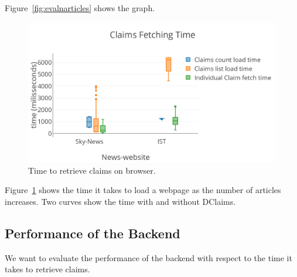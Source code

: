  Figure~\ref{fig:evalnarticles} shows the graph.


\begin{figure}[t]
  \centering
  \includegraphics[width=\columnwidth]{figures/chart-fetch.png}
  \vspace{-10pt}
  \caption{Time to retrieve claims on browser.}
  \label{fig:evalclaims}
\end{figure}

Figure~\ref{fig:evalclaims} shows the time it takes to load a webpage as the number of articles increases. Two curves show the time with and without DClaims.
\fi

\subsection{Performance of the Backend}

We want to evaluate the performance of the backend with respect to the time it takes to retrieve claims.





